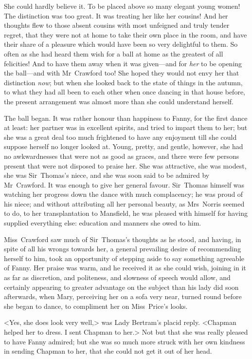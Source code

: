 She could hardly believe it. To be placed above so many elegant young women! The distinction was too great. It was treating her like her cousins! And her thoughts flew to those absent cousins with most unfeigned and truly tender regret, that they were not at home to take their own place in the room, and have their share of a pleasure which would have been so very delightful to them. So often as she had heard them wish for a ball at home as the greatest of all felicities! And to have them away when it was given—and for \textit{her}  to be opening the ball—and with Mr~Crawford too! She hoped they would not envy her that distinction \textit{now}; but when she looked back to the state of things in the autumn, to what they had all been to each other when once dancing in that house before, the present arrangement was almost more than she could understand herself.

The ball began. It was rather honour than happiness to Fanny, for the first dance at least: her partner was in excellent spirits, and tried to impart them to her; but she was a great deal too much frightened to have any enjoyment till she could suppose herself no longer looked at. Young, pretty, and gentle, however, she had no awkwardnesses that were not as good as graces, and there were few persons present that were not disposed to praise her. She was attractive, she was modest, she was Sir~Thomas's niece, and she was soon said to be admired by Mr~Crawford. It was enough to give her general favour. Sir~Thomas himself was watching her progress down the dance with much complacency; he was proud of his niece; and without attributing all her personal beauty, as Mrs~Norris seemed to do, to her transplantation to Mansfield, he was pleased with himself for having supplied everything else: education and manners she owed to him.

Miss~Crawford saw much of Sir~Thomas's thoughts as he stood, and having, in spite of all his wrongs towards her, a general prevailing desire of recommending herself to him, took an opportunity of stepping aside to say something agreeable of Fanny. Her praise was warm, and he received it as she could wish, joining in it as far as discretion, and politeness, and slowness of speech would allow, and certainly appearing to greater advantage on the subject than his lady did soon afterwards, when Mary, perceiving her on a sofa very near, turned round before she began to dance, to compliment her on Miss~Price's looks.

<Yes, she does look very well,> was Lady Bertram's placid reply. <Chapman helped her to dress. I sent Chapman to her.> Not but that she was really pleased to have Fanny admired; but she was so much more struck with her own kindness in sending Chapman to her, that she could not get it out of her head.

